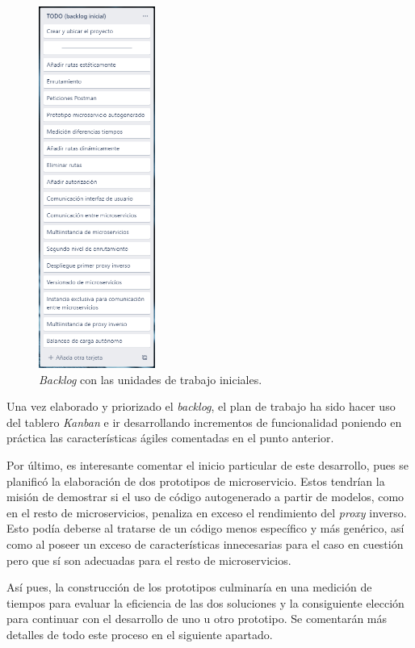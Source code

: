 \documentclass[11pt,spanish,listoffigures]{tfgetsinf}
\begin{document}
\begin{figure}[ht]
\centering
\includegraphics[width=0.34\textwidth]{imagenes/backlogInicial}
\caption{\emph{Backlog} con las unidades de trabajo iniciales.}
	\label{kanbanInicial}
\end{figure}

Una vez elaborado y priorizado el \emph{backlog}, el plan de trabajo ha sido hacer uso del tablero \emph{Kanban} e ir desarrollando incrementos de funcionalidad poniendo en práctica las características ágiles comentadas en el punto anterior.

Por último, es interesante comentar el inicio particular de este desarrollo, pues se planificó la elaboración de dos prototipos de microservicio. Estos tendrían la misión de demostrar si el uso de código autogenerado a partir de modelos, como en el resto de microservicios, penaliza en exceso el rendimiento del \emph{proxy} inverso. Esto podía deberse al tratarse de un código menos específico y más genérico, así como al poseer un exceso de características innecesarias para el caso en cuestión pero que sí son adecuadas para el resto de microservicios.

Así pues, la construcción de los prototipos culminaría en una medición de tiempos para evaluar la eficiencia de las dos soluciones y la consiguiente elección para continuar con el desarrollo de uno u otro prototipo. Se comentarán más detalles de todo este proceso en el siguiente apartado.
\end{document}
